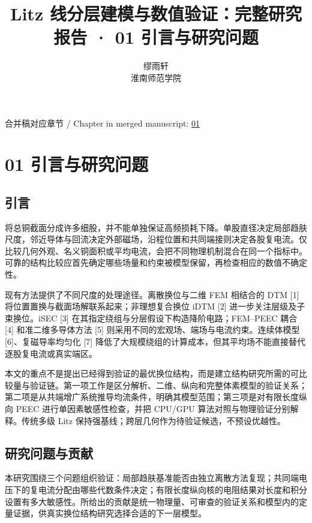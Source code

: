 \documentclass[11pt]{article}
\begin{document}
\title{Litz 线分层建模与数值验证：完整研究报告 · 01 引言与研究问题}
\author{缪雨轩\\淮南师范学院}
\date{}
\maketitle
\noindent 合并稿对应章节 / Chapter in merged manuscript: \href{report_zh-CN_single.pdf#chapter-01}{01}\par
\FloatBarrier
\section*{01 引言与研究问题}
\hypertarget{chapter-01}{}
\subsection*{引言}
\hypertarget{01.introduction.heading}{}
将总铜截面分成许多细股，并不能单独保证高频损耗下降。单股直径决定局部趋肤尺度，邻近导体与回流决定外部磁场，沿程位置和共同端接则决定各股复电流。仅比较几何外观、名义铜面积或平均电流，会把不同物理机制混合在同一个指标中。可靠的结构比较应首先确定哪些场量和约束被模型保留，再检查相应的数值不确定性。


现有方法提供了不同尺度的处理途径。离散换位与二维 FEM 相结合的 DTM [1] 将位置置换与截面场解联系起来；非理想复合换位 iDTM [2] 进一步关注层级及子束换位。iSEC [3] 在其指定绕组与分层假设下构造降阶电路；FEM–PEEC 耦合 [4] 和准二维多导体方法 [5] 则采用不同的宏观场、端场与电流约束。连续体模型 [6]、复磁导率均匀化 [7] 降低了大规模绕组的计算成本，但其平均场不能直接替代逐股复电流或真实端区。


本文的重点不是提出已经得到验证的最优换位结构，而是建立结构研究所需的可比较量与验证链。第一项工作是区分解析、二维、纵向和完整体素模型的验证关系；第二项是从共端增广系统推导均流条件，明确其模型范围；第三项是对有限长度纵向 PEEC 进行单因素敏感性检查，并把 CPU/GPU 算法对照与物理验证分别解释。传统多级 Litz 保持强基线；跨层几何作为待验证候选，不预设优越性。


\subsection*{研究问题与贡献}
\hypertarget{01.scope.heading}{}
本研究围绕三个问题组织验证：局部趋肤基准能否由独立离散方法复现；共同端电压下的复电流分配由哪些代数条件决定；有限长度纵向核的电阻结果对长度和积分设置有多大敏感性。所给出的贡献是统一物理量、可审查的验证关系和模型内的定量证据，供真实换位结构研究选择合适的下一层模型。
\end{document}
